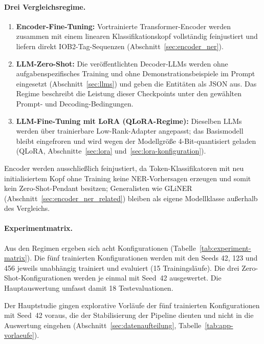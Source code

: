 \paragraph{Drei Vergleichsregime.}
\begin{enumerate}
    \item \textbf{Encoder-Fine-Tuning:} Vortrainierte Transformer-Encoder
    werden zusammen mit einem linearen Klassifikationskopf vollständig
    feinjustiert und liefern direkt IOB2-Tag-Sequenzen
    (Abschnitt~\ref{sec:encoder_ner}).

    \item \textbf{LLM-Zero-Shot:} Die veröffentlichten Decoder-LLMs
    werden ohne aufgabenspezifisches Training und ohne
    Demonstrationsbeispiele im Prompt eingesetzt
    (Abschnitt~\ref{sec:llms}) und geben die Entitäten als JSON aus.
    Das Regime beschreibt die Leistung dieser Checkpoints unter den
    gewählten Prompt- und Decoding-Bedingungen.

    \item \textbf{LLM-Fine-Tuning mit LoRA (QLoRA-Regime):} Dieselben
    LLMs werden über trainierbare Low-Rank-Adapter angepasst; das
    Basismodell bleibt eingefroren und wird wegen der Modellgröße
    4-Bit-quantisiert geladen (QLoRA, Abschnitte~\ref{sec:lora}
    und~\ref{sec:lora-konfiguration}).
\end{enumerate}

Encoder werden ausschließlich feinjustiert, da Token-Klassifikatoren mit
neu initialisiertem Kopf ohne Training keine NER-Vorhersagen erzeugen und
somit kein Zero-Shot-Pendant besitzen; Generalisten wie GLiNER
(Abschnitt~\ref{sec:encoder_ner_related}) bleiben als eigene Modellklasse außerhalb des
Vergleichs.

\paragraph{Experimentmatrix.}
Aus den Regimen ergeben sich acht Konfigurationen
(Tabelle~\ref{tab:experiment-matrix}).
Die fünf trainierten Konfigurationen werden mit den Seeds 42, 123 und 456
jeweils unabhängig trainiert und evaluiert (15 Trainingsläufe). Die drei
Zero-Shot-Konfigurationen werden je einmal mit Seed~42 ausgewertet.
Die Hauptauswertung umfasst damit 18 Testevaluationen.

Der Hauptstudie gingen explorative Vorläufe der fünf trainierten
Konfigurationen mit Seed~42 voraus, die der Stabilisierung der Pipeline
dienten und nicht in die Auswertung eingehen
(Abschnitt~\ref{sec:datenaufteilung}, Tabelle~\ref{tab:app-vorlaeufe}).

